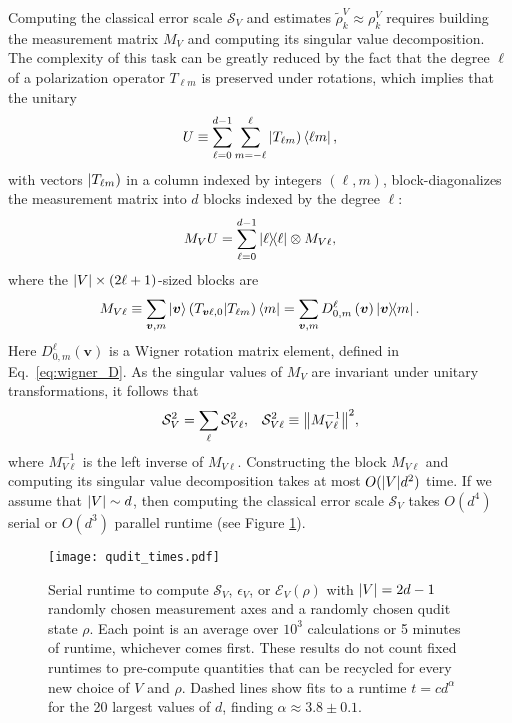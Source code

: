 \documentclass[nofootinbib,twocolumn]{revtex4-1}
\newcommand{\p}[1]{\left(#1\right)} %
\newcommand{\E}{\mathcal{E}}
\renewcommand{\S}{\mathcal{S}}
\def\oket#1{\mathinner{|{#1})}}
\def\obk#1{\mathinner{({#1})}}
\begin{document}
Computing the classical error scale $\S_V$ and estimates $\tilde\rho^V_k\approx\rho^V_k$ requires building the measurement matrix $M_V$ and computing its singular value decomposition.
The complexity of this task can be greatly reduced by the fact that the degree $\ell$ of a polarization operator $T_{\ell m}$ is preserved under rotations, which implies that the unitary
\begin{align}
  U \equiv \sum_{\ell=0}^{d-1} \sum_{m=-\ell}^\ell
  \oket{T_{\ell m}} \bra{\ell m},
  \label{eq:trans_basis}
\end{align}
with vectors $\oket{T_{\ell m}}$ in a column indexed by integers $\p{\ell,m}$, block-diagonalizes the measurement matrix into $d$ blocks indexed by the degree $\ell$:
\begin{align}
  M_V U = \sum_{\ell=0}^{d-1} \op{\ell} \otimes M_{V\ell},
\end{align}
where the $\abs{V}\times\p{2\ell+1}$-sized blocks are
\begin{align}
  M_{V\ell} \equiv \sum_{\bm v,m} \ket{\bm v}
  \obk{T_{\bm v\ell,0}|T_{\ell m}} \bra{m}
  = \sum_{\bm v,m} D^\ell_{0,m}\p{\bm v} \op{\bm v}{m}.
  \label{eq:block}
\end{align}
Here $D^\ell_{0,m}\p{\bm v}$ is a Wigner rotation matrix element, defined in Eq.~\eqref{eq:wigner_D}.
As the singular values of $M_V$ are invariant under unitary transformations, it follows that
\begin{align}
  \S_V^2 = \sum_\ell \S_{V\ell}^2,
  &&
  \S_{V\ell}^2 \equiv \norm{M_{V\ell}^{-1}}^2,
\end{align}
where $M_{V\ell}^{-1}$ is the left inverse of $M_{V\ell}$.
Constructing the block $M_{V\ell}$ and computing its singular value decomposition takes at most $O(\abs{V}d^2)$ time.
If we assume that $\abs{V}\sim d$, then computing the classical error scale $\S_V$ takes $O(d^4)$ serial or $O(d^3)$ parallel runtime (see Figure \ref{fig:times}).

\begin{figure}
  \centering
  \texttt{[image: qudit\_times.pdf]}
  \caption{Serial runtime to compute $\S_V$, $\epsilon_V$, or $\E_V\p{\rho}$ with $\abs{V}=2d-1$ randomly chosen measurement axes and a randomly chosen qudit state $\rho$.
    Each point is an average over $10^3$ calculations or 5 minutes of runtime, whichever comes first.
    These results do not count fixed runtimes to pre-compute quantities that can be recycled for every new choice of $V$ and $\rho$.
    Dashed lines show fits to a runtime $t=c d^\alpha$ for the 20 largest values of $d$, finding $\alpha\approx 3.8\pm0.1$.}
  \label{fig:times}
\end{figure}
\end{document}
